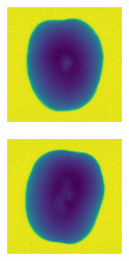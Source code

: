 \documentclass[11pt]{article}
\begin{document}
\begin{figure}[!h]
\begin{subfigure}[b]{0.22\textwidth}
         \caption{}
         \label{fig:hollow_1}
     \end{subfigure}
     \hfill
     \begin{subfigure}[b]{0.22\textwidth}
         \centering
         \includegraphics[width=\textwidth]{figurer/potato_dataset/hollow/hollow_2.jpg}
         \caption{}
         \label{fig:hollow_2}
     \end{subfigure}
     \hfill
     \begin{subfigure}[b]{0.22\textwidth}
         \centering
         \includegraphics[width=\textwidth]{figurer/potato_dataset/hollow/hollow_3.jpg}

\end{subfigure}
\end{figure}
\end{document}
